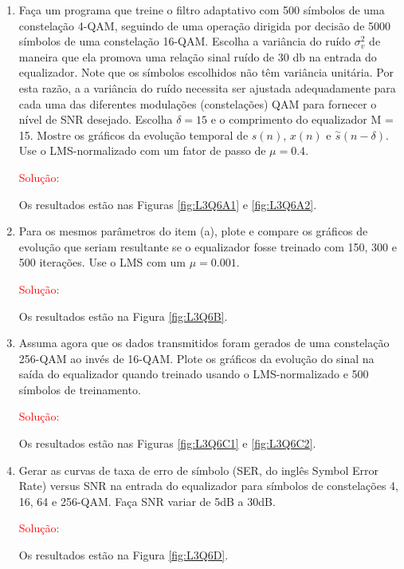 \documentclass[a4paper,10pt]{article}
\begin{document}
\begin{enumerate}
\begin{enumerate}
					\item Faça um programa que treine o ﬁltro adaptativo com 500 símbolos de uma constelação 4-QAM, seguindo de uma operação dirigida por decisão de 5000 símbolos de uma constelação 16-QAM. Escolha a variância do ruído $\sigma^{2}_{v}$ de maneira que ela promova uma relação sinal ruído de 30 db na entrada do equalizador. Note que os símbolos escolhidos não têm variância unitária. Por esta razão, a a variância do ruído necessita ser ajustada adequadamente para cada uma das diferentes modulações (constelações) QAM para fornecer o nível de SNR desejado. Escolha $\delta = 15$ e o comprimento do equalizador M = 15. Mostre os gráﬁcos da evolução temporal de $s(n)$, $x(n)$ e $\overset{\sim}{s}(n - \delta)$. Use o LMS-normalizado com um fator de passo de $\mu = 0.4$.
								
						\textcolor{red}{Solução:}

						Os resultados estão nas Figuras \ref{fig:L3Q6A1} e \ref{fig:L3Q6A2}.

					\item Para os mesmos parâmetros do item (a), plote e compare os gráﬁcos de evolução que seriam resultante se o equalizador fosse treinado com 150, 300 e 500 iterações. Use o LMS com um
					$\mu = 0.001$.
					
						\textcolor{red}{Solução:}

						Os resultados estão na Figura \ref{fig:L3Q6B}.

					\item Assuma agora que os dados transmitidos foram gerados de uma constelação 256-QAM ao invés de 16-QAM. Plote os gráﬁcos da evolução do sinal na saída do equalizador quando treinado
					usando o LMS-normalizado e 500 símbolos de treinamento.					
					
						\textcolor{red}{Solução:}

						Os resultados estão nas Figuras \ref{fig:L3Q6C1} e \ref{fig:L3Q6C2}.

					\item Gerar as curvas de taxa de erro de símbolo (SER, do inglês Symbol Error Rate) versus SNR na entrada do equalizador para símbolos de constelações 4, 16, 64 e 256-QAM. Faça SNR variar
					de 5dB a 30dB.
					
						\textcolor{red}{Solução:}

						Os resultados estão na Figura \ref{fig:L3Q6D}.

				\end{enumerate}
				

\end{enumerate}
\end{document}
